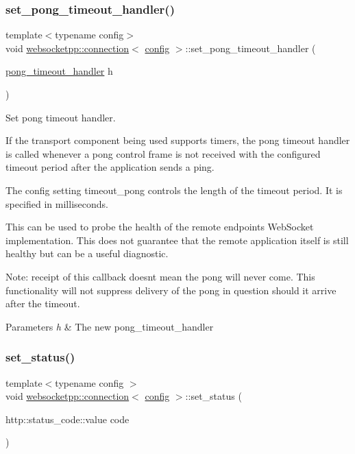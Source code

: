 \subsubsection{\texorpdfstring{set\+\_\+pong\+\_\+timeout\+\_\+handler()}{set\_pong\_timeout\_handler()}}
{\footnotesize\ttfamily template$<$typename config$>$ \\
void \mbox{\hyperlink{classwebsocketpp_1_1connection}{websocketpp\+::connection}}$<$ \mbox{\hyperlink{classconfig}{config}} $>$\+::set\+\_\+pong\+\_\+timeout\+\_\+handler (\begin{DoxyParamCaption}\item[{\mbox{\hyperlink{namespacewebsocketpp_a2c5925a111b9e553efebea35d5ea155f}{pong\+\_\+timeout\+\_\+handler}}}]{h }\end{DoxyParamCaption})\hspace{0.3cm}{\ttfamily [inline]}}



Set pong timeout handler. 

If the transport component being used supports timers, the pong timeout handler is called whenever a pong control frame is not received with the configured timeout period after the application sends a ping.

The config setting {\ttfamily timeout\+\_\+pong} controls the length of the timeout period. It is specified in milliseconds.

This can be used to probe the health of the remote endpoint\textquotesingle{}s Web\+Socket implementation. This does not guarantee that the remote application itself is still healthy but can be a useful diagnostic.

Note\+: receipt of this callback doesn\textquotesingle{}t mean the pong will never come. This functionality will not suppress delivery of the pong in question should it arrive after the timeout.


\begin{DoxyParams}{Parameters}
{\em h} & The new pong\+\_\+timeout\+\_\+handler \\
\hline
\end{DoxyParams}
\mbox{\label{classwebsocketpp_1_1connection_a96d445ff0cc75b854c4500e93a054acb}} 
\subsubsection{\texorpdfstring{set\+\_\+status()}{set\_status()}\hspace{0.1cm}{\footnotesize\ttfamily [1/2]}}
{\footnotesize\ttfamily template$<$typename config $>$ \\
void \mbox{\hyperlink{classwebsocketpp_1_1connection}{websocketpp\+::connection}}$<$ \mbox{\hyperlink{classconfig}{config}} $>$\+::set\+\_\+status (\begin{DoxyParamCaption}\item[{http\+::status\+\_\+code\+::value}]{code }\end{DoxyParamCaption})}



